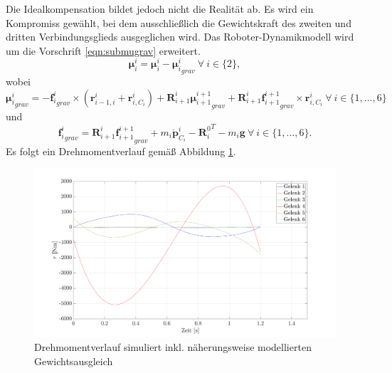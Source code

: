 %
Die Idealkompensation bildet jedoch nicht die Realität ab. Es wird ein Kompromiss gewählt, bei dem ausschließlich die  Gewichtskraft des zweiten und dritten Verbindungsglieds ausgeglichen wird. Das Roboter-Dynamikmodell wird um die Vorschrift \ref{eqn:submugrav} erweitert.
%
\begin{equation}
	\label{eqn:submugrav}
\bm{\mu}^{i}_{i} = \bm{\mu}^{i}_{i} - {\bm{\mu}^{i}_{i}}_{grav} ~\forall ~i \in \{2\}, 
\end{equation}
%
wobei
%
\begin{equation}
	\label{eqn:mugrav}
	{\bm{\mu}^{i}_{i}}_{grav} = -{\bm{f}^{i}_{i}}_{grav} \times \left( \bm{r}^{i}_{i-1,i} + \bm{r}^{i}_{i,C_i} \right) + \bm{R}^{i}_{i+1} {\bm{\mu}^{i+1}_{i+1}}_{grav} + \bm{R}^{i}_{i+1} {\bm{f}^{i+1}_{i+1}}_{grav} \times \bm{r}^{i}_{i,C_i} ~\forall ~i \in \{1,...,6\}
\end{equation}
%
und 
%
\begin{equation}
	\label{eqn:subfgrav}
	{\bm{f}^{i}_{i}}_{grav} = \bm{R}^{i}_{i+1} {\bm{f}^{i+1}_{i+1}}_{grav} + m_i\ddot{\bm{p}}^{i}_{C_i} - {\bm{R}^0_i}^T - m_i \bm{g} ~\forall ~i \in \{1,...,6\}.
\end{equation}
%
Es folgt ein Drehmomentverlauf gemäß Abbildung \ref{fig:taumat-fg}. 
%
\begin{figure}[tbph]
	\centering
	\includegraphics[width=0.9\linewidth]{images/taumat-fg}
	\caption{Drehmomentverlauf simuliert inkl. näherungsweise modellierten Gewichtsausgleich}
	\label{fig:taumat-fg}
\end{figure}
%
%
